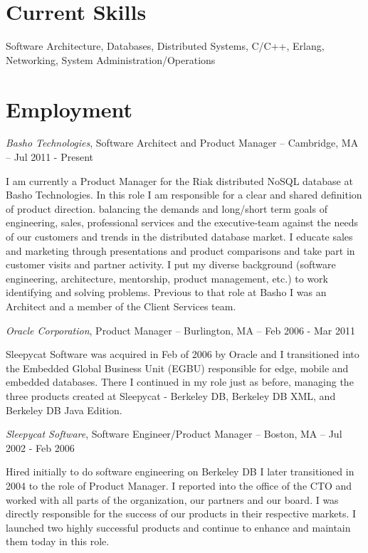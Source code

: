 \documentclass[letterpaper]{article}
\renewenvironment{itemize}{
  \begin{list}{}{
    \setlength{\leftmargin}{1.5em}
  }
}{
  \end{list}
}
\begin{document}
\section*{Current Skills}

\begin{itemize}
\item Software Architecture, Databases, Distributed Systems, C/C++, Erlang,
  Networking, System Administration/Operations
\end{itemize}


\section*{Employment}

\begin{itemize}
\item {\it Basho Technologies}, Software Architect and Product Manager -- Cambridge, MA -- Jul 2011 - Present

I am currently a Product Manager for the Riak distributed NoSQL database at
Basho Technologies. In this role I am responsible for a clear and shared
definition of product direction.
balancing the demands and
long/short term goals of engineering, sales, professional services and the
executive-team against the needs of our customers and trends in the distributed
database market. I educate sales and marketing through presentations and
product comparisons and take part in customer visits and partner activity. I
put my diverse background (software engineering, architecture, mentorship,
product management, etc.) to work identifying and solving problems. Previous to
that role at Basho I was an Architect and a member of the Client Services team.

\begin{itemize}
\item {\it Oracle Corporation}, Product Manager -- Burlington, MA -- Feb 2006 - Mar 2011

Sleepycat Software was acquired in Feb of 2006 by Oracle and I transitioned
into the Embedded Global Business Unit (EGBU) responsible for edge, mobile and
embedded databases. There I continued in my role just as before, managing the
three products created at Sleepycat - Berkeley DB, Berkeley DB XML, and
Berkeley DB Java Edition.

\item {\it Sleepycat Software}, Software Engineer/Product Manager -- Boston, MA -- Jul 2002 - Feb 2006

Hired initially to do software engineering on Berkeley DB I later transitioned
in 2004 to the role of Product Manager. I reported into the office of the CTO
and worked with all parts of the organization, our partners and our board. I
was directly responsible for the success of our products in their respective
markets. I launched two highly successful products and continue to enhance and
maintain them today in this role.


\end{itemize}
\end{itemize}
\end{document}
